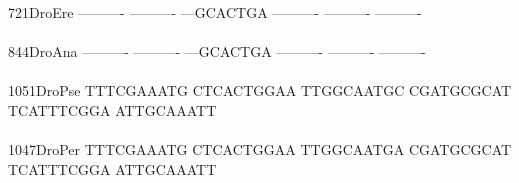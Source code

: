 \documentclass[11pt,twoside,reqno,a4paper]{article}
\begin{document}
{721\hspace*{2\charwidth}DroEre	----------	----------	---GCACTGA	----------	----------	----------	\\
\hspace*{5\charwidth}\hspace*{7\charwidth}\hspace*{1\charwidth}\hspace*{1\charwidth}\hspace*{1\charwidth}\hspace*{1\charwidth}\hspace*{1\charwidth}\hspace*{1\charwidth}\\
844\hspace*{2\charwidth}DroAna	----------	----------	---GCACTGA	----------	----------	----------	\\
\hspace*{5\charwidth}\hspace*{7\charwidth}\hspace*{1\charwidth}\hspace*{1\charwidth}\hspace*{1\charwidth}\hspace*{1\charwidth}\hspace*{1\charwidth}\hspace*{1\charwidth}\\
1051\hspace*{1\charwidth}DroPse	TTTCGAAATG	CTCACTGGAA	TTGGCAATGC	CGATGCGCAT	TCATTTCGGA	ATTGCAAATT	\\
\hspace*{5\charwidth}\hspace*{7\charwidth}\hspace*{1\charwidth}\hspace*{1\charwidth}\hspace*{1\charwidth}\hspace*{1\charwidth}\hspace*{1\charwidth}\hspace*{1\charwidth}\\
1047\hspace*{1\charwidth}DroPer	TTTCGAAATG	CTCACTGGAA	TTGGCAATGA	CGATGCGCAT	TCATTTCGGA	ATTGCAAATT	\\
\hspace*{5\charwidth}\hspace*{7\charwidth}\hspace*{1\charwidth}\hspace*{1\charwidth}\hspace*{1\charwidth}\hspace*{1\charwidth}\hspace*{1\charwidth}\hspace*{1\charwidth}\\
}
\end{document}
